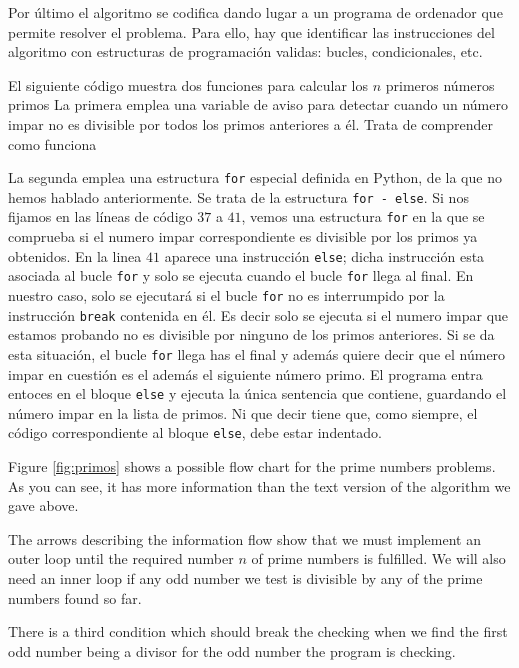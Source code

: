 \begin{paracol}{2}
Por último el algoritmo se codifica dando lugar a un programa de ordenador que permite resolver el problema. Para ello, hay que identificar las instrucciones del algoritmo con estructuras de programación validas: bucles, condicionales, etc.

El siguiente código muestra dos funciones para calcular los $n$ primeros números primos La primera emplea una variable de aviso para detectar cuando un número impar no es divisible por todos los primos anteriores a él. Trata de comprender como funciona

La segunda emplea una estructura \texttt{for} especial definida en Python, de la que no hemos hablado anteriormente. Se trata de la estructura \texttt{for - else}.
Si nos fijamos en las líneas de código $37$ a $41$, vemos una estructura \texttt{for} en la que se comprueba si el numero impar correspondiente es divisible por los primos ya obtenidos. En la linea $41$ aparece una instrucción \texttt{else}; dicha instrucción esta asociada al bucle \texttt{for} y solo se ejecuta cuando el bucle \texttt{for} llega al final. En nuestro caso, solo se ejecutará si el bucle \texttt{for} no es interrumpido por la instrucción \texttt{break} contenida en él. Es decir solo se ejecuta si el numero impar que estamos probando no es divisible por ninguno de los primos anteriores. Si se da esta situación, el bucle \texttt{for} llega has el final y además quiere decir que el número impar en cuestión es el además el siguiente número primo. El programa entra entoces en el bloque \texttt{else} y ejecuta la única sentencia que contiene, guardando el número impar en la lista de primos. Ni que decir tiene que, como siempre, el código correspondiente al bloque \texttt{else}, debe estar indentado. 

\switchcolumn
Figure \ref{fig:primos} shows a possible flow chart for the prime numbers problems. As you can see, it has more information than the text version of the algorithm we gave above.

The arrows describing the information flow show that we must implement an outer loop until the required number $n$ of prime numbers is fulfilled. We will also need an inner loop if any odd number we test is divisible by any of the prime numbers found so far.

There is a third condition which should break the checking when we find the first odd number being a divisor for the odd number the program is checking.


\end{paracol}
